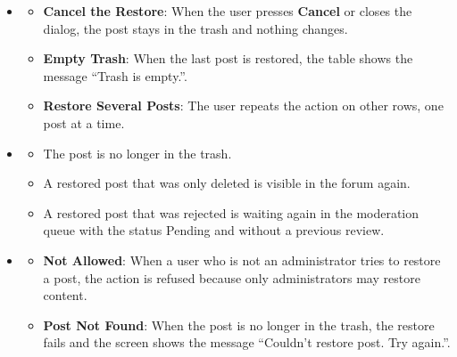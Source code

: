 \begin{itemize}[leftmargin=1.6em,topsep=4pt,itemsep=3pt,parsep=0pt,label=$\bullet$]
\begin{itemize}[leftmargin=2.2em,topsep=2pt,itemsep=3pt,parsep=0pt,label=$\circ$]
\begin{itemize}[leftmargin=2.2em,topsep=2pt,itemsep=3pt,parsep=0pt,label=$\blacksquare$]
                    \item A post that was rejected is put back into the moderation queue with the status Pending, so the administrator can review it again in the Moderation screen.
                \end{itemize}
            \item \textbf{Update the Trash}: The restored post disappears from the trash list and the remaining rows move up.
        \end{itemize}
    \item {}
        \begin{itemize}[leftmargin=2.2em,topsep=2pt,itemsep=3pt,parsep=0pt,label=$\circ$]
            \item \textbf{Cancel the Restore}: When the user presses \textbf{Cancel} or closes the dialog, the post stays in the trash and nothing changes.
            \item \textbf{Empty Trash}: When the last post is restored, the table shows the message ``Trash is empty.''.
            \item \textbf{Restore Several Posts}: The user repeats the action on other rows, one post at a time.
        \end{itemize}
    \item {}
        \begin{itemize}[leftmargin=2.2em,topsep=2pt,itemsep=3pt,parsep=0pt,label=$\circ$]
            \item The post is no longer in the trash.
            \item A restored post that was only deleted is visible in the forum again.
            \item A restored post that was rejected is waiting again in the moderation queue with the status Pending and without a previous review.
        \end{itemize}
    \item {}
        \begin{itemize}[leftmargin=2.2em,topsep=2pt,itemsep=3pt,parsep=0pt,label=$\circ$]
            \item \textbf{Not Allowed}: When a user who is not an administrator tries to restore a post, the action is refused because only administrators may restore content.
            \item \textbf{Post Not Found}: When the post is no longer in the trash, the restore fails and the screen shows the message ``Couldn't restore post. Try again.''.

\end{itemize}
\end{itemize}
